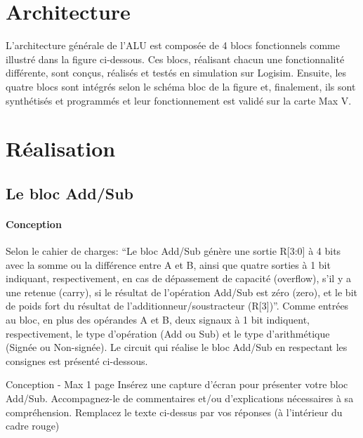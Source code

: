 \documentclass[a4paper]{article}
\begin{document}
\section{Architecture}
L’architecture générale de l’ALU est composée de 4 blocs fonctionnels comme illustré dans la figure ci-dessous. Ces blocs, réalisant chacun une fonctionnalité différente, sont conçus, réalisés et testés en simulation sur Logisim. Ensuite, les quatre blocs sont intégrés selon le schéma bloc de la figure et, finalement, ils sont synthétisés et programmés et leur fonctionnement est validé sur la carte Max V. 

\section{Réalisation}
\subsection{Le bloc Add/Sub} \label{add_Sub}

\paragraph{Conception}
Selon le cahier de charges: “Le bloc Add/Sub génère une sortie R[3:0] à 4 bits avec la somme ou la différence entre A et B, ainsi que quatre sorties à 1 bit indiquant, respectivement, en cas de dépassement de capacité (overflow), s’il y a une retenue (carry), si le résultat de l’opération Add/Sub est zéro (zero), et le bit de poids fort du résultat de l’additionneur/soustracteur (R[3])”. Comme entrées au bloc, en plus des opérandes A et B, deux signaux à 1 bit indiquent, respectivement, le type d’opération (Add ou Sub) et le type d’arithmétique (Signée ou Non-signée). Le circuit qui réalise le bloc Add/Sub en respectant les consignes est présenté ci-dessous.\\


\begin{tcolorbox}[colframe=Monokaimagenta,colback=white]
Conception - Max 1 page 
Insérez une capture d’écran pour présenter votre bloc Add/Sub.
Accompagnez-le de commentaires et/ou d’explications nécessaires à sa compréhension.
Remplacez le texte ci-dessus par vos réponses (à l’intérieur du cadre rouge)
\end{tcolorbox}
\end{document}
